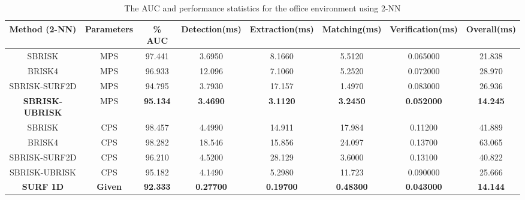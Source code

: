 \documentclass{article}
\begin{document}
\begin{table}
\caption{The AUC and performance statistics for the office environment using
2-NN}
\footnotesize
\begin{tabular}{|c|c|c|c|c|c|c|c|}
\hline 
\textbf{Method (2-NN)} & \textbf{Parameters} & \textbf{\% AUC} & \textbf{Detection(ms)} & \textbf{Extraction(ms)} & \textbf{Matching(ms)} & \textbf{Verification(ms)} & \textbf{Overall(ms)}\tabularnewline
\hline 
\hline 
SBRISK & MPS & 97.441 & 3.6950 & 8.1660 & 5.5120 & 0.065000 & 21.838\tabularnewline
\hline 
BRISK4 & MPS & 96.933 & 12.096 & 7.1060 & 5.2520 & 0.072000 & 28.970\tabularnewline
\hline 
SBRISK-SURF2D & MPS & 94.795 & 3.7930 & 17.157 & 1.4970 & 0.083000 & 26.936\tabularnewline
\hline 
\textbf{SBRISK-UBRISK} & MPS & \textbf{95.134} & \textbf{3.4690} & \textbf{3.1120} & \textbf{3.2450} & \textbf{0.052000} & \textbf{14.245}\tabularnewline
\hline 
SBRISK & CPS & 98.457 & 4.4990 & 14.911 & 17.984 & 0.11200 & 41.889\tabularnewline
\hline 
BRISK4 & CPS & 98.282 & 18.546 & 15.856 & 24.097 & 0.13700 & 63.065\tabularnewline
\hline 
SBRISK-SURF2D & CPS & 96.210 & 4.5200 & 28.129 & 3.6000 & 0.13100 & 40.822\tabularnewline
\hline 
SBRISK-UBRISK & CPS & 95.182 & 4.1490 & 5.2980 & 11.723 & 0.090000 & 25.666\tabularnewline
\hline 
\textbf{SURF 1D} & \textbf{Given} & \textbf{92.333} & \textbf{0.27700} & \textbf{0.19700} & \textbf{0.48300} & \textbf{0.043000} & \textbf{14.144}\tabularnewline
\hline 
\end{tabular}
\end{table}
\end{document}
